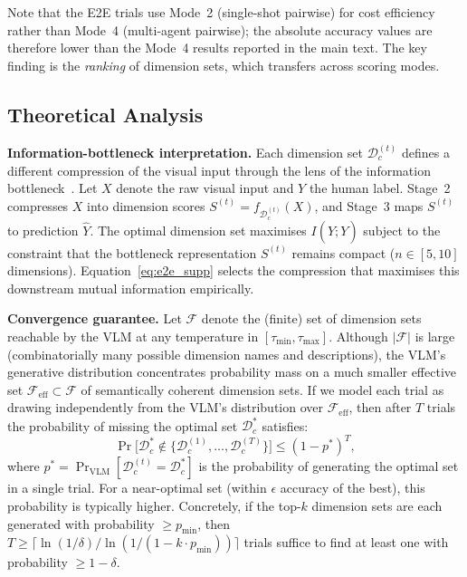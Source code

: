 \documentclass[runningheads]{llncs}
\begin{document}
Note that the E2E trials use Mode~2 (single-shot pairwise) for cost efficiency rather than Mode~4 (multi-agent pairwise); the absolute accuracy values are therefore lower than the Mode~4 results reported in the main text.
The key finding is the \emph{ranking} of dimension sets, which transfers across scoring modes.

\subsection{Theoretical Analysis}

\noindent\textbf{Information-bottleneck interpretation.}
Each dimension set $\mathcal{D}_c^{(t)}$ defines a different compression of the visual input through the lens of the information bottleneck~\cite{tishby2000information}.
Let $X$ denote the raw visual input and $Y$ the human label.
Stage~2 compresses $X$ into dimension scores $S^{(t)}=f_{\mathcal{D}_c^{(t)}}(X)$, and Stage~3 maps $S^{(t)}$ to prediction $\hat{Y}$.
The optimal dimension set maximises $I(\hat{Y}; Y)$ subject to the constraint that the bottleneck representation $S^{(t)}$ remains compact ($n \in [5,10]$ dimensions).
Equation~\eqref{eq:e2e_supp} selects the compression that maximises this downstream mutual information empirically.

\smallskip\noindent\textbf{Convergence guarantee.}
Let $\mathcal{F}$ denote the (finite) set of dimension sets reachable by the VLM at any temperature in $[\tau_{\min}, \tau_{\max}]$.
Although $|\mathcal{F}|$ is large (combinatorially many possible dimension names and descriptions), the VLM's generative distribution concentrates probability mass on a much smaller effective set $\mathcal{F}_{\mathrm{eff}} \subset \mathcal{F}$ of semantically coherent dimension sets.
If we model each trial as drawing independently from the VLM's distribution over $\mathcal{F}_{\mathrm{eff}}$, then after $T$ trials the probability of missing the optimal set $\mathcal{D}_c^*$ satisfies:
\begin{equation}
\Pr\bigl[\mathcal{D}_c^* \notin \{\mathcal{D}_c^{(1)}, \ldots, \mathcal{D}_c^{(T)}\}\bigr] \leq (1 - p^*)^T,
\label{eq:convergence_supp}
\end{equation}
where $p^* = \Pr_{\mathrm{VLM}}[\mathcal{D}_c^{(t)} = \mathcal{D}_c^*]$ is the probability of generating the optimal set in a single trial.
For a near-optimal set (within $\epsilon$ accuracy of the best), this probability is typically higher.
Concretely, if the top-$k$ dimension sets are each generated with probability $\geq p_{\min}$, then $T \geq \lceil \ln(1/\delta) / \ln(1/(1-k \cdot p_{\min})) \rceil$ trials suffice to find at least one with probability $\geq 1-\delta$.
\end{document}
